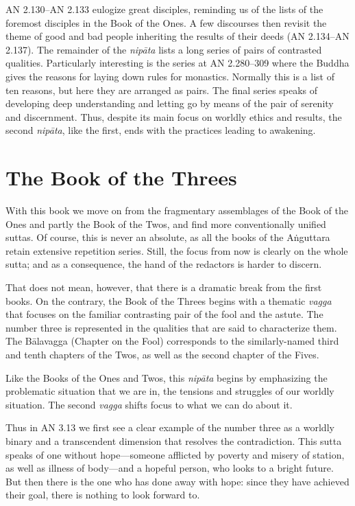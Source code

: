 \documentclass[12pt,openany]{book}%
\begin{document}
AN 2.130–AN 2.133 eulogize great disciples, reminding us of the lists of the foremost disciples in the Book of the Ones. A few discourses then revisit the theme of good and bad people inheriting the results of their deeds (AN 2.134–AN 2.137). The remainder of the \textit{\textsanskrit{nipāta}} lists a long series of pairs of contrasted qualities. Particularly interesting is the series at AN 2.280–309 where the Buddha gives the reasons for laying down rules for monastics. Normally this is a list of ten reasons, but here they are arranged as pairs. The final series speaks of developing deep understanding and letting go by means of the pair of serenity and discernment. Thus, despite its main focus on worldly ethics and results, the second \textit{\textsanskrit{nipāta}}, like the first, ends with the practices leading to awakening.

\section*{The Book of the Threes}

With this book we move on from the fragmentary assemblages of the Book of the Ones and partly the Book of the Twos, and find more conventionally unified suttas. Of course, this is never an absolute, as all the books of the \textsanskrit{Aṅguttara} retain extensive repetition series. Still, the focus from now is clearly on the whole sutta; and as a consequence, the hand of the redactors is harder to discern.

That does not mean, however, that there is a dramatic break from the first books. On the contrary, the Book of the Threes begins with a thematic \textit{vagga} that focuses on the familiar contrasting pair of the fool and the astute. The number three is represented in the qualities that are said to characterize them. The \textsanskrit{Bālavagga} (Chapter on the Fool) corresponds to the similarly-named third and tenth chapters of the Twos, as well as the second chapter of the Fives.

Like the Books of the Ones and Twos, this \textit{\textsanskrit{nipāta}} begins by emphasizing the problematic situation that we are in, the tensions and struggles of our worldly situation. The second \textit{vagga} shifts focus to what we can do about it.

Thus in AN 3.13 we first see a clear example of the number three as a worldly binary and a transcendent dimension that resolves the contradiction. This sutta speaks of one without hope—someone afflicted by poverty and misery of station, as well as illness of body—and a hopeful person, who looks to a bright future. But then there is the one who has done away with hope: since they have achieved their goal, there is nothing to look forward to.
\end{document}

